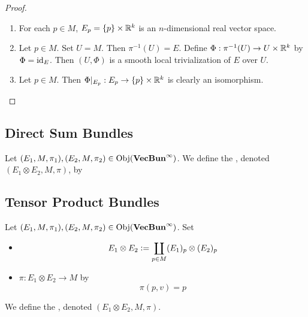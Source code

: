 \documentclass{book}
\begin{document}
\begin{proof}\
\begin{enumerate}
\item For each $p \in M$, $E_p = \{p\} \times \mathbb{R}^k$ is an $n$-dimensional real vector space.
\item Let $p \in M$. Set $U = M$. Then $\pi^{-1}(U) = E$. Define $\Phi: \pi^{-1}(U) \rightarrow U \times \mathbb{R}^k$ by $\Phi = \operatorname{id}_E$. Then $(U, \Phi)$ is a smooth local trivialization of $E$ over $U$.   
\item Let $p \in M$. Then $\Phi|_{E_p}: E_p \rightarrow \{p\} \times \mathbb{R}^k$ is clearly an isomorphism. 
\end{enumerate}
\end{proof}
























\subsection{Direct Sum Bundles}


\begin{defn}
	Let $(E_1, M, \pi_1), (E_2, M, \pi_2) \in \operatorname{Obj}(\operatorname*{\text{\textbf{VecBun}}^{\infty}})$. We define the , denoted $(E_1 \otimes E_2, M, \pi)$, by
\end{defn}

















\subsection{Tensor Product Bundles}


\begin{defn}
Let $(E_1, M, \pi_1), (E_2, M, \pi_2) \in \operatorname{Obj}(\operatorname*{\text{\textbf{VecBun}}^{\infty}})$. Set
\begin{itemize}
	\item $$E_1 \otimes E_2 \vcentcolon= \coprod_{p \in M} (E_1)_p \otimes (E_2)_p$$
	\item $\pi: E_1 \otimes E_2 \rightarrow M$ by 
	$$\pi(p, v) = p$$
\end{itemize}

 We define the , denoted $(E_1 \otimes E_2, M, \pi)$.
\end{defn}
\end{document}
